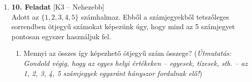 \documentclass[12pt,a4paper]{article}
\begin{document}
\begin{enumerate}[label=\arabic*., leftmargin=*]
    \item \textbf{10. Feladat} \textsf{\small [K3 – Nehezebb]} \\
    Adott az $\{1, 2, 3, 4, 5\}$ számhalmaz. Ebből a számjegyekből tetszőleges sorrendben ötjegyű számokat képezünk úgy, hogy mind az 5 számjegyet pontosan egyszer használjuk fel.
    \begin{enumerate}[label=\alph*)]
        \item Mennyi az összes így képezhető ötjegyű szám összege? (\emph{Útmutatás: Gondold végig, hogy az egyes helyi értékeken – egyesek, tízesek, stb. – az 1, 2, 3, 4, 5 számjegyek egyaránt hányszor fordulnak elő!})
    \end{enumerate}

\end{enumerate}
\end{document}
